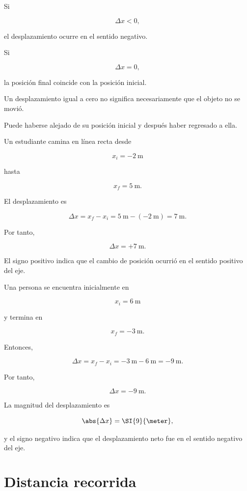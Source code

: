 Si

\[ \Delta x<0, \]

el desplazamiento ocurre en el sentido negativo.

Si

\[ \Delta x=0, \]

la posición final coincide con la posición inicial.

\begin{advertencia}
Un desplazamiento igual a cero no significa necesariamente que el objeto no
se movió.

Puede haberse alejado de su posición inicial y después haber regresado a
ella.
\end{advertencia}


\begin{ejemplo}
Un estudiante camina en línea recta desde

\[ x_i=-\SI{2}{\meter} \]

hasta

\[ x_f=\SI{5}{\meter}. \]

El desplazamiento es

\[
\Delta x=x_f-x_i
=\SI{5}{\meter}-(-\SI{2}{\meter})
=\SI{7}{\meter}.
\]

Por tanto,

\[ \boxed{\Delta x=+\SI{7}{\meter}}. \]

El signo positivo indica que el cambio de posición ocurrió en el sentido
positivo del eje.
\end{ejemplo}


\begin{ejemplo}
Una persona se encuentra inicialmente en

\[ x_i=\SI{6}{\meter} \]

y termina en

\[ x_f=-\SI{3}{\meter}. \]

Entonces,

\[
\Delta x=x_f-x_i
=-\SI{3}{\meter}-\SI{6}{\meter}
=-\SI{9}{\meter}.
\]

Por tanto,

\[ \boxed{\Delta x=-\SI{9}{\meter}}. \]

La magnitud del desplazamiento es

\[ \abs{\Delta x}=\SI{9}{\meter}, \]

y el signo negativo indica que el desplazamiento neto fue en el sentido
negativo del eje.
\end{ejemplo}


\section{Distancia recorrida}


